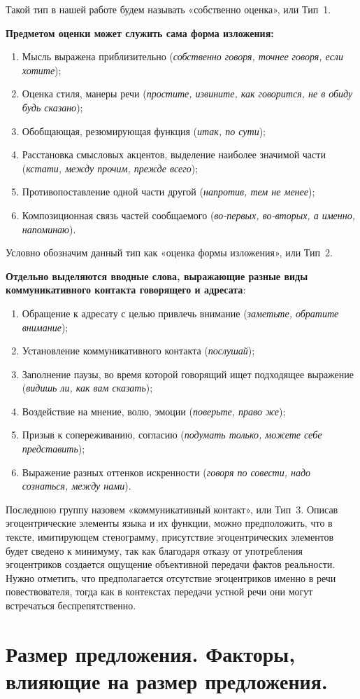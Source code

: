 \documentclass{kursa4}
\begin{document}
      Такой тип в нашей работе будем называть «собственно оценка», или Тип~1. 

      \textbf{Предметом оценки может служить сама форма изложения:}
      \begin{enumerate}
        \item Мысль выражена приблизительно (\textit{собственно говоря, точнее говоря, если хотите}); \item Оценка стиля, манеры речи (\textit{простите, извините, как говорится, не в обиду будь сказано}); \item Обобщающая, резюмирующая функция (\textit{итак, по сути}); \item Расстановка смысловых акцентов, выделение наиболее значимой части (\textit{кстати, между прочим, прежде всего}); \item Противопоставление одной части другой (\textit{напротив, тем не менее}); \item Композиционная связь частей сообщаемого (\textit{во-первых, во-вторых, а именно, напоминаю}). \end{enumerate}

      Условно обозначим данный тип как «оценка формы изложения», или Тип~2. 

      \textbf{Отдельно выделяются вводные слова, выражающие разные виды коммуникативного контакта говорящего и адресата}: \begin{enumerate}
        \item Обращение к адресату с целью привлечь внимание (\textit{заметьте, обратите внимание}); \item Установление коммуникативного контакта (\textit{послушай}); \item Заполнение паузы, во время которой говорящий ищет подходящее выражение (\textit{видишь ли, как вам сказать}); \item Воздействие на мнение, волю, эмоции (\textit{поверьте, право же}); \item Призыв к сопереживанию, согласию (\textit{подумать только, можете себе представить}); \item Выражение разных оттенков искренности (\textit{говоря по совести, надо сознаться, между нами}). \end{enumerate}
      Последнюю группу назовем «коммуникативный контакт», или Тип~3. Описав эгоцентрические элементы языка и их функции, можно предположить, что в тексте, имитирующем стенограмму, присутствие эгоцентрических элементов будет сведено к минимуму, так как благодаря отказу от употребления эгоцентриков создается ощущение объективной передачи фактов реальности. Нужно отметить, что предполагается отсутствие эгоцентриков именно в речи повествователя, тогда как в контекстах передачи устной речи они могут встречаться беспрепятственно. \section{Размер предложения. Факторы, влияющие на размер предложения.}
\end{document}
